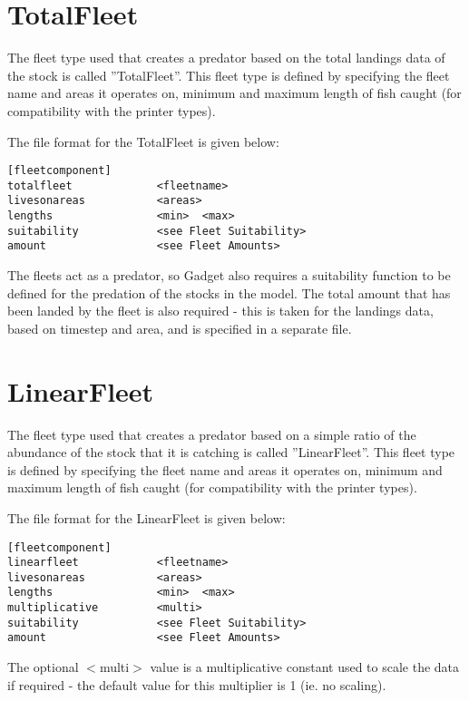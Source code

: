 \documentclass [a4paper, 10pt]{book}
\begin{document}
\newpage
\section{TotalFleet}\label{sec:totalfleet}
The fleet type used that creates a predator based on the total landings data of the stock is called ''TotalFleet''.  This fleet type is defined by specifying the fleet name and areas it operates on, minimum and maximum length of fish caught (for compatibility with the printer types).

\bigskip
The file format for the TotalFleet is given below:

{\small\begin{verbatim}
[fleetcomponent]
totalfleet             <fleetname>
livesonareas           <areas>
lengths                <min>  <max>
suitability            <see Fleet Suitability>
amount                 <see Fleet Amounts>
\end{verbatim}}

The fleets act as a predator, so Gadget also requires a suitability function to be defined for the predation of the stocks in the model.  The total amount that has been landed by the fleet is also required - this is taken for the landings data, based on timestep and area, and is specified in a separate file.

\section{LinearFleet}\label{sec:linearfleet}
The fleet type used that creates a predator based on a simple ratio of the abundance of the stock that it is catching is called ''LinearFleet''.  This fleet type is defined by specifying the fleet name and areas it operates on, minimum and maximum length of fish caught (for compatibility with the printer types).

\bigskip
The file format for the LinearFleet is given below:

{\small\begin{verbatim}
[fleetcomponent]
linearfleet            <fleetname>
livesonareas           <areas>
lengths                <min>  <max>
multiplicative         <multi>
suitability            <see Fleet Suitability>
amount                 <see Fleet Amounts>
\end{verbatim}}

The optional $<$multi$>$ value is a multiplicative constant used to scale the data if required - the default value for this multiplier is 1 (ie. no scaling).
\end{document}
